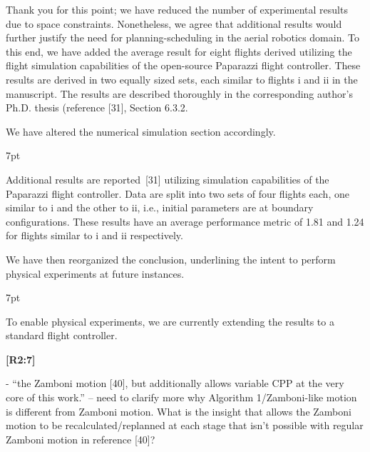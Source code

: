 \documentclass[10pt]{letter}
\newenvironment{formal}{%
  \def\FrameCommand{%
    \hspace{1pt}%
    {\color{red}\vrule width 2pt}%
    {\color{formalshade}\vrule width 4pt}%
    \colorbox{formalshade}%
  }%
  \MakeFramed{\advance\hsize-\width\FrameRestore}%
  \noindent\hspace{-4.55pt}%
  \begin{adjustwidth}{}{7pt}%
  \vspace{2pt}\vspace{2pt}%
}
{%
  \vspace{2pt}\end{adjustwidth}\endMakeFramed%
}
\begin{document}
  {\color{blue} 
  
  {\hspace*{-4.5em}{[R2:6]}\vspace*{-1.9em}}

  Thank you for this point; we have reduced the number of experimental results due to space constraints. Nonetheless, we agree that additional results would further justify the need for planning-scheduling in the aerial robotics domain. To this end, we have added the average result for eight flights derived utilizing the flight simulation capabilities of the open-source Paparazzi flight controller. These results are derived in two equally sized sets, each similar to flights i and ii in the manuscript. The results are described thoroughly in the corresponding author's Ph.D. thesis (reference [{\color{green}31}], Section 6.3.2.
  
  We have altered the numerical simulation section accordingly.

  \begin{formal}
    {\color{blue}
    Additional results are reported~[{\color{green}31}] utilizing simulation capabilities of the Paparazzi flight controller. Data are split into two sets of four flights each, one similar to {\color{red}i} and the other to {\color{red}ii}, i.e., initial parameters are at boundary configurations.
    These results have an average performance metric of 1.81 and 1.24 for flights similar to {\color{red}i} and {\color{red}ii} respectively.}    

    \vspace*{1ex}
  \end{formal}

  We have then reorganized the conclusion, underlining the intent to perform physical experiments at future instances.
  
  \begin{formal}
  \color{black}
  {\color{blue}To enable physical experiments}, we are currently extending the results to a standard flight controller.
  \end{formal}
  }

{\hspace*{-4.5em}\textbf{[R2:7]}\vspace*{-1.9em}}

- ``the Zamboni motion [40], but additionally allows variable CPP at the very core of this work.'' -- need to clarify more why Algorithm 1/Zamboni-like motion is different from Zamboni motion. What is the   insight that allows the Zamboni motion to be recalculated/replanned at each stage that isn't possible with regular Zamboni motion in reference [40]? 
\end{document}
